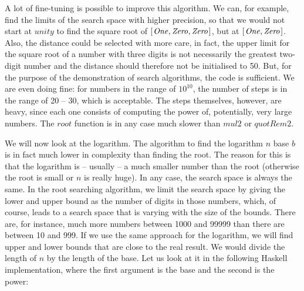\documentclass{scrreprt}
\newcommand{\Conid}[1]{\mathit{#1}}
\newcommand{\Varid}[1]{\mathit{#1}}
\begin{document}
{A lot of fine-tuning is possible to improve
this algorithm.
We can, for example, find the limits 
of the search space with higher precision,
so that we would not start at \ensuremath{\Varid{unity}} to find the
square root of \ensuremath{[\mskip1.5mu \Conid{One},\Conid{Zero},\Conid{Zero}\mskip1.5mu]}, but at \ensuremath{[\mskip1.5mu \Conid{One},\Conid{Zero}\mskip1.5mu]}.
Also, the distance could be selected with more care,
in fact, the upper limit for the square root of 
a number with three digits is not necessarily
the greatest two-digit number and the distance
should therefore not be initialised to 50.
But, for the purpose of the demonstration 
of search algorithms, the code is sufficient.
We are even doing fine:
for numbers in the range of $10^{10}$,
the number of steps is in the range of 20 -- 30,
which is acceptable.
The steps themselves, however, are heavy,
since each one consists of computing the power
of, potentially, very large numbers.
The \ensuremath{\Varid{root}} function is in any case
much slower than \ensuremath{\Varid{mul2}} or \ensuremath{\Varid{quotRem2}}.

We will now look at the logarithm.
The algorithm to find the logarithm \ensuremath{\Varid{n}} base \ensuremath{\Varid{b}}
is in fact much lower in complexity
than finding the root.
The reason for this is that 
the logarithm is -- usually -- a much smaller number
than the root (otherwise the root is small
or \ensuremath{\Varid{n}} is really huge).
In any case, the search space is always the same.
In the root searching algorithm,
we limit the search space by giving
the lower and upper bound as the number of digits
in those numbers,
which, of course, leads to a search space
that is varying with the size of the bounds.
There are, for instance, much more numbers
between \num{1000} and \num{99999} than there are
between \num{10} and \num{999}.
If we use the same approach for the logarithm,
we will find upper and lower bounds 
that are close to the real result.
We would divide the length of \ensuremath{\Varid{n}} by the length
of the base. 
Let us look at it in the following Haskell implementation,
where the first argument is the base and the second
is the power:

}
\end{document}
